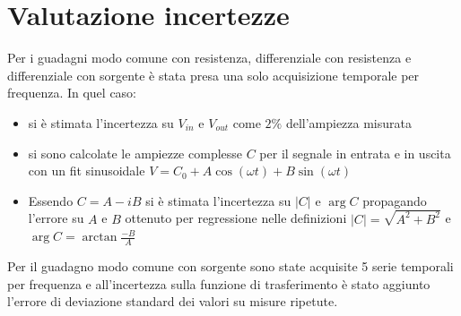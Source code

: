 \documentclass{article}
\begin{document}
\section*{Valutazione incertezze}
Per i guadagni modo comune con resistenza, differenziale con resistenza e differenziale con sorgente è stata presa una solo acquisizione temporale per frequenza. In quel caso:
\begin{itemize}
    \item si è stimata l'incertezza su $V_{in}$ e $V_{out}$ come $2\%$ dell'ampiezza misurata
    \item si sono calcolate le ampiezze complesse $C$ per il segnale in entrata e in uscita con un fit sinusoidale $V = C_0 + A\cos(\omega t) + B\sin(\omega t)$
    \item Essendo $C = A - iB$ si è stimata l'incertezza su $|C|$ e $\arg{C}$ propagando l'errore su $A$ e $B$ ottenuto per regressione nelle definizioni 
    $|C| = \sqrt{A^2 + B^2}$ e $\arg{C} = \arctan{\frac{-B}{A}}$
\end{itemize}
Per il guadagno modo comune con sorgente sono state acquisite 5 serie temporali per frequenza e all'incertezza sulla funzione di trasferimento è stato aggiunto l'errore di deviazione standard dei valori su misure ripetute.
\end{document}
